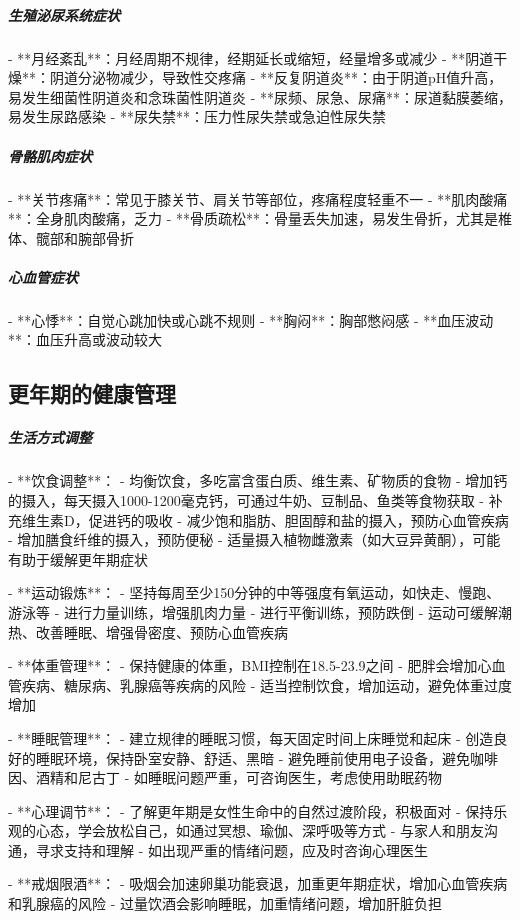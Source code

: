 \begin{enumerate}
\subparagraph{生殖泌尿系统症状}

- **月经紊乱**：月经周期不规律，经期延长或缩短，经量增多或减少
- **阴道干燥**：阴道分泌物减少，导致性交疼痛
- **反复阴道炎**：由于阴道pH值升高，易发生细菌性阴道炎和念珠菌性阴道炎
- **尿频、尿急、尿痛**：尿道黏膜萎缩，易发生尿路感染
- **尿失禁**：压力性尿失禁或急迫性尿失禁

\subparagraph{骨骼肌肉症状}

- **关节疼痛**：常见于膝关节、肩关节等部位，疼痛程度轻重不一
- **肌肉酸痛**：全身肌肉酸痛，乏力
- **骨质疏松**：骨量丢失加速，易发生骨折，尤其是椎体、髋部和腕部骨折

\subparagraph{心血管症状}

- **心悸**：自觉心跳加快或心跳不规则
- **胸闷**：胸部憋闷感
- **血压波动**：血压升高或波动较大

\subsection{更年期的健康管理}

\subparagraph{生活方式调整}

- **饮食调整**：
  - 均衡饮食，多吃富含蛋白质、维生素、矿物质的食物
  - 增加钙的摄入，每天摄入1000-1200毫克钙，可通过牛奶、豆制品、鱼类等食物获取
  - 补充维生素D，促进钙的吸收
  - 减少饱和脂肪、胆固醇和盐的摄入，预防心血管疾病
  - 增加膳食纤维的摄入，预防便秘
  - 适量摄入植物雌激素（如大豆异黄酮），可能有助于缓解更年期症状

- **运动锻炼**：
  - 坚持每周至少150分钟的中等强度有氧运动，如快走、慢跑、游泳等
  - 进行力量训练，增强肌肉力量
  - 进行平衡训练，预防跌倒
  - 运动可缓解潮热、改善睡眠、增强骨密度、预防心血管疾病

- **体重管理**：
  - 保持健康的体重，BMI控制在18.5-23.9之间
  - 肥胖会增加心血管疾病、糖尿病、乳腺癌等疾病的风险
  - 适当控制饮食，增加运动，避免体重过度增加

- **睡眠管理**：
  - 建立规律的睡眠习惯，每天固定时间上床睡觉和起床
  - 创造良好的睡眠环境，保持卧室安静、舒适、黑暗
  - 避免睡前使用电子设备，避免咖啡因、酒精和尼古丁
  - 如睡眠问题严重，可咨询医生，考虑使用助眠药物

- **心理调节**：
  - 了解更年期是女性生命中的自然过渡阶段，积极面对
  - 保持乐观的心态，学会放松自己，如通过冥想、瑜伽、深呼吸等方式
  - 与家人和朋友沟通，寻求支持和理解
  - 如出现严重的情绪问题，应及时咨询心理医生

- **戒烟限酒**：
  - 吸烟会加速卵巢功能衰退，加重更年期症状，增加心血管疾病和乳腺癌的风险
  - 过量饮酒会影响睡眠，加重情绪问题，增加肝脏负担


\end{enumerate}
